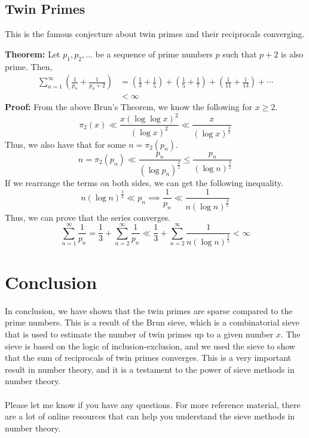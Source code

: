 \documentclass[8pt]{extarticle}
\begin{document}
\subsection{Twin Primes}
This is the famous conjecture about twin primes and their reciprocals converging.
\begin{boxedsection}
    \textbf{Theorem:} Let $p_1, p_2, \dots$ be a sequence of prime numbers $p$ such that $p+2$ is also prime. Then,
    \begin{align*}
        \sum_{n=1}^\infty \left(\frac{1}{p_n} + \frac{1}{p_n+2}\right) &= \left(\frac{1}{3} + \frac{1}{5}\right) + \left(\frac{1}{5} + \frac{1}{7}\right) + \left(\frac{1}{11} + \frac{1}{13}\right) + \cdots\\
        &< \infty
    \end{align*}
    \textbf{Proof:} From the above Brun's Theorem, we know the following for $x \geq 2$.
    $$
    \pi_2(x) \ll \frac{x (\log \log x)^2}{(\log x)^2} \ll \frac{x}{(\log x)^{\frac{3}{2}}}
    $$
    Thus, we also have that for some $n = \pi_2(p_n)$.
    $$
    n = \pi_2(p_n) \ll \frac{p_n}{(\log p_n)^{\frac{3}{2}}} \leq \frac{p_n}{(\log n)^\frac{3}{2}}
    $$
    If we rearrange the terms on both sides, we can get the following inequality.
    $$
    n (\log n)^{\frac{3}{2}} \ll p_n \implies \frac{1}{p_n} \ll \frac{1}{n (\log n)^{\frac{3}{2}}}
    $$
    Thus, we can prove that the series converges.
    $$
    \sum_{n=1}^\infty \frac{1}{p_n} = \frac{1}{3} + \sum_{n=2}^\infty \frac{1}{p_n} \ll \frac{1}{3} + \sum_{n=2}^\infty \frac{1}{n (\log n)^{\frac{3}{2}}} < \infty
    $$
\end{boxedsection}
\section{Conclusion}
In conclusion, we have shown that the twin primes are sparse compared to the prime numbers. This is a result of the Brun sieve, which is a combinatorial sieve that is used to estimate the number of twin primes up to a given number $x$. The sieve is based on the logic of inclusion-exclusion, and we used the sieve to show that the sum of reciprocals of twin primes converges. This is a very important result in number theory, and it is a testament to the power of sieve methods in number theory.\\
\\
Please let me know if you have any questions. For more reference material, there are a lot of online resources that can help you understand the sieve methods in number theory. 
\end{document}
